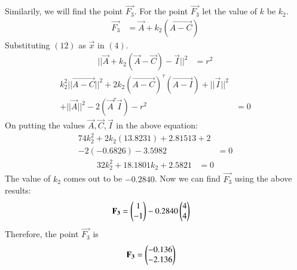 \documentclass[journal,12pt,twocolumn]{IEEEtran}
\theoremstyle{remark}
\begin{document}
Similarily, we will find the point $\vec{F_3}$. For the point $\vec{F_3}$ let the value of $k$ be $k_2$. 
\begin{align}
\vec{F_3} &=\vec{A}+k_2(\vec{A-C})
\end{align}
Substituting $(12)$ as $\vec{x}$ in $(4)$.
\begin{align}
||\vec{A}+k_2(\vec{A}-\vec{C})-\vec{I}||^2 &= r^2
\end{align}
\begin{align}
k_2^2||\vec{A-C}||^2+2k_2(\vec{A-C})^\tau(\vec{A-I})+||\vec{I}||^2 \nonumber \\
+||\vec{A}||^2-2(\vec{A}^\tau\vec{I})-r^2 &= 0
\end{align}
On putting the values $\vec{A}, \vec{C}, \vec{I}$ in the above equation:
\begin{align}
74k_2^2+2k_2(13.8231)+2.81513+2 \nonumber \\
-2(-0.6826)-3.5982 &= 0
\end{align}
\begin{align}
32k_2^2+18.1801k_2+2.5821 &= 0
\end{align}
The value of $k_2$ comes out to be $-0.2840$.
Now we can find $\vec{F_3}$ using the above results:
\begin{align}
\mathbf{F_3} &=\begin{pmatrix}1\\-1\end{pmatrix}-0.2840\begin{pmatrix}4\\4\end{pmatrix}
\end{align}
Therefore, the point $\vec{F_3}$ is
\begin{align}
\mathbf{F_3} &=\begin{pmatrix}-0.136\\-2.136\end{pmatrix}
\end{align}
\end{document}
